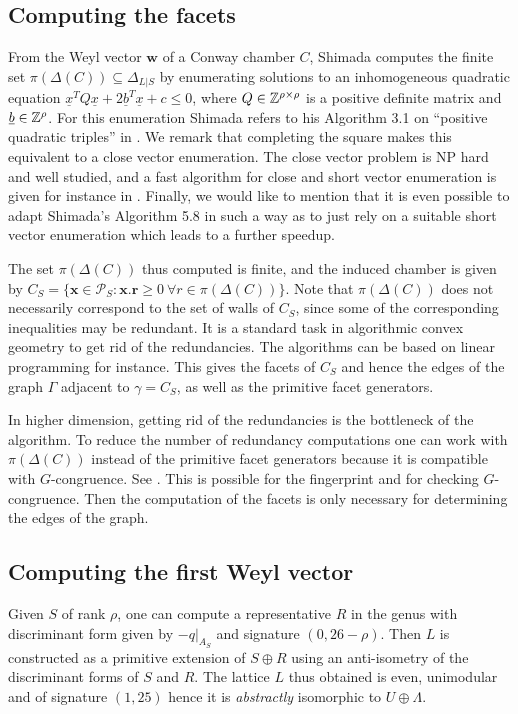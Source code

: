 \documentclass[11pt,letterpaper]{amsart}
\newcommand{\vect}[1]{\boldsymbol{#1}}
\begin{document}
\subsection{Computing the facets}
From the Weyl vector $\vect{w}$ of a Conway chamber $C$, Shimada computes the finite set  $\pi(\Delta(C)) \subseteq \Delta_{L|S}$ by enumerating solutions to an inhomogeneous quadratic equation $\underline{x}^T Q \underline{x} + 2 \underline{b}^T \underline{x} + c \leq 0$, where $Q \in \mathbb{Z}^{\rho \times \rho}$ is a positive definite matrix and $\underline{b} \in \mathbb{Z}^\rho$. 
For this enumeration Shimada refers to his Algorithm 3.1 on ``positive quadratic triples'' in \cite{shimada.char5}.
We remark that completing the square makes this equivalent to a close vector enumeration. The close vector problem is NP hard and well studied, and a fast algorithm for close and short vector enumeration is given for instance in \cite{fincke.pohst}. 
Finally, we would like to mention that it is even possible to adapt Shimada's Algorithm 5.8 in such a way as to just rely on a suitable short vector enumeration which leads to a further speedup.

The set $\pi(\Delta(C))$ thus computed is finite, and the induced chamber is given by $C_S= \{\vect{x} \in \mathcal{P}_S : \vect{x}.\vect{r} \geq 0 \  \forall r \in \pi(\Delta(C))\}$. Note that $\pi(\Delta(C))$ does not necessarily correspond to the set of walls of $C_S$, since some of the corresponding inequalities may be redundant. It is a standard task in algorithmic convex geometry to get rid of the redundancies. The algorithms can be based on linear programming for instance.
This gives the facets of $C_S$ and hence the edges of the graph $\Gamma$ adjacent to $\gamma = C_S$, as well as the primitive facet generators.

\begin{remark}
In higher dimension, getting rid of the redundancies is the bottleneck of the algorithm. To reduce the number of redundancy computations one can work with $\pi(\Delta(C))$ instead of the primitive facet generators because it is compatible with $G$-congruence. See \cite[Remark 6.8]{shimada.borcherds}. This is possible for the fingerprint and for checking $G$-congruence. Then the computation of the facets is only necessary for determining the edges of the graph.
\end{remark}

\subsection{Computing the first Weyl vector}
Given $S$ of rank $\rho$, one can compute a representative $R$ in the genus with discriminant form given by $-q|_{A_S}$ and signature $(0, 26-\rho)$.
Then $L$ is constructed as a primitive extension of $S \oplus R$ using an anti-isometry of the discriminant forms of $S$ and $R$.
The lattice $L$ thus obtained is even, unimodular and of signature $(1,25)$ hence it is \emph{abstractly} isomorphic to $U \oplus \Lambda$. 
\end{document}
